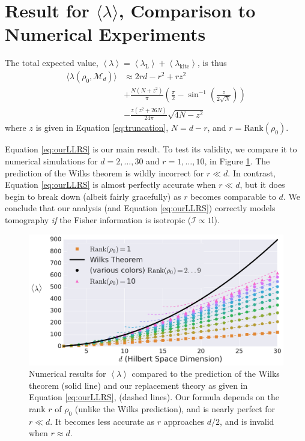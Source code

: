 \documentclass[aps,pra, twocolumn]{revtex4-1}
\newcommand{\M}{\mathcal{M}}
\newcommand{\Id}{\mathbb{I}}
\newcommand{\expect}[1]{\ensuremath{\left\langle#1\right\rangle}}
\def\Id{1\!\mathrm{l}}
\newcommand{\Fi}{\mathcal{I}}
\begin{document}
\section{Result for $\langle \lambda \rangle$, Comparison to Numerical Experiments}
The total expected value, $\expect{\lambda} = \expect{\lambda_{\mathrm{L}}} + \expect{\lambda_{\mathrm{kite}}}$, is thus
\begin{align}
\label{eq:ourLLRS}
\nonumber \langle \lambda(\rho_{0}, \M_{d}) \rangle &\approx 2rd - r^{2}+rz^{2}\\
\nonumber & + \frac{N(N+z^{2})}{\pi}\left(\frac{\pi}{2} - \sin^{-1}\left(\frac{z}{2\sqrt{N}}\right)\right) \\
& - \frac{z(z^{2}+26N)}{24\pi}\sqrt{4N-z^{2}}
\end{align}
where $z$ is given in Equation \eqref{eq:truncation}, $N=d-r$, and $r = \mathrm{Rank}(\rho_{0})$.

Equation \eqref{eq:ourLLRS} is our main result.  To test its validity, we compare it to numerical simulations for $d=2,\ldots,30$ and $r=1,\ldots,10$, in Figure \ref{fig:modelcomp-iso}.  The prediction of the Wilks theorem is wildly incorrect for $r\ll d$. In contrast, Equation \eqref{eq:ourLLRS} is almost perfectly accurate when $r \ll d$, but it does begin to break down (albeit fairly gracefully) as $r$ becomes comparable to $d$.  We conclude that our analysis (and Equation \eqref{eq:ourLLRS}) correctly models tomography \emph{if} the Fisher information is isotropic ($\Fi \propto \Id$).

\begin{figure}[h]
 \includegraphics[width=\columnwidth]{Images/Figure_6.pdf}
 \caption{Numerical results for $\expect{\lambda}$ compared to the prediction of the Wilks theorem (solid line) and our replacement theory as given in Equation \eqref{eq:ourLLRS}, (dashed lines).  Our formula depends on the rank $r$ of $\rho_0$ (unlike the Wilks prediction), and is nearly perfect for $r\ll d$.  It becomes less accurate as $r$ approaches $d/2$, and is invalid when $r\approx d$.}
 \label{fig:modelcomp-iso}
\end{figure}
\end{document}
